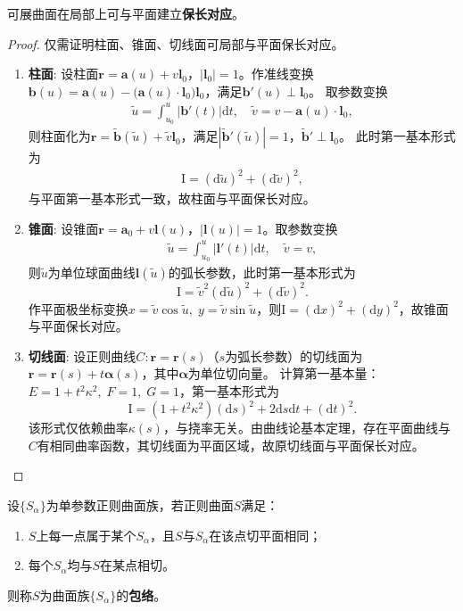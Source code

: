 \documentclass[../../main.tex]{subfiles}%
\begin{document}
\begin{theorem}
可展曲面在局部上可与平面建立\textbf{保长对应}。
\end{theorem}
\begin{proof}
仅需证明柱面、锥面、切线面可局部与平面保长对应。
\begin{enumerate}[(1)]
\item \textbf{柱面}:
设柱面$\bm r=\bm a(u)+v\bm l_0$，$|\bm l_0|=1$。作准线变换$\bm b(u)=\bm a(u)-\big(\bm a(u)\cdot\bm l_0\big)\bm l_0$，满足$\bm b'(u)\perp\bm l_0$。
取参数变换
\begin{align*}
\tilde u=\int_{u_0}^{u}|\bm b'(t)|\mathrm{d}t,\quad \tilde v=v-\bm a(u)\cdot\bm l_0,
\end{align*}
则柱面化为$\bm r=\tilde{\bm b}(\tilde u)+\tilde v\bm l_0$，满足$|\tilde{\bm b}'(\tilde u)|=1$，$\tilde{\bm b}'\perp\bm l_0$。
此时第一基本形式为
\begin{align*}
\mathrm{I}=(\mathrm{d}\tilde u)^2+(\mathrm{d}\tilde v)^2,
\end{align*}
与平面第一基本形式一致，故柱面与平面保长对应。

\item \textbf{锥面}:
设锥面$\bm r=\bm a_0+v\bm l(u)$，$|\bm l(u)|=1$。取参数变换
\begin{align*}
\tilde u=\int_{u_0}^{u}|\bm l'(t)|\mathrm{d}t,\quad \tilde v=v,
\end{align*}
则$\tilde u$为单位球面曲线$\bm l(\tilde u)$的弧长参数，此时第一基本形式为
$$\mathrm{I}=\tilde v^2(\mathrm{d}\tilde u)^2+(\mathrm{d}\tilde v)^2.$$
作平面极坐标变换$x=\tilde v\cos\tilde u,\;y=\tilde v\sin\tilde u$，则$\mathrm{I}=(\mathrm{d}x)^2+(\mathrm{d}y)^2$，故锥面与平面保长对应。

\item \textbf{切线面}:
设正则曲线$C:\bm r=\bm r(s)$（$s$为弧长参数）的切线面为$\bm r=\bm r(s)+t\bm\alpha(s)$，其中$\bm\alpha$为单位切向量。
计算第一基本量：$E=1+t^2\kappa^2,\;F=1,\;G=1$，第一基本形式为
$$\mathrm{I}=(1+t^2\kappa^2)(\mathrm{d}s)^2+2\mathrm{d}s\mathrm{d}t+(\mathrm{d}t)^2.$$
该形式仅依赖曲率$\kappa(s)$，与挠率无关。由曲线论基本定理，存在平面曲线与$C$有相同曲率函数，其切线面为平面区域，故原切线面与平面保长对应。
\end{enumerate}
\end{proof}

\begin{definition}
设$\{S_\alpha\}$为单参数正则曲面族，若正则曲面$S$满足：
\begin{enumerate}[(1)]
\item $S$上每一点属于某个$S_\alpha$，且$S$与$S_\alpha$在该点切平面相同；
\item 每个$S_\alpha$均与$S$在某点相切。
\end{enumerate}
则称$S$为曲面族$\{S_\alpha\}$的\textbf{包络}。
\end{definition}
\end{document}

